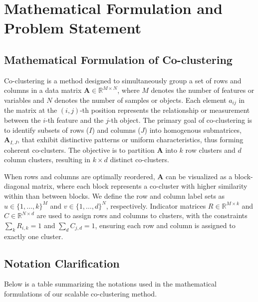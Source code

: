 
\section{Mathematical Formulation and Problem Statement}\label{sec:formula}
\subsection{Mathematical Formulation of Co-clustering}
Co-clustering is a method designed to simultaneously group a set of rows and columns in a data matrix $\mathbf{A} \in \mathbb{R}^{M \times N}$, where $M$ denotes the number of features or variables and $N$ denotes the number of samples or objects. Each element $a_{ij}$ in the matrix at the $(i, j)$-th position represents the relationship or measurement between the $i$-th feature and the $j$-th object. The primary goal of co-clustering is to identify subsets of rows ($I$) and columns ($J$) into homogenous submatrices, $\mathbf{A}_{I, J}$, that exhibit distinctive patterns or uniform characteristics, thus forming coherent co-clusters. The objective is to partition $\mathbf{A}$ into $k$ row clusters and $d$ column clusters, resulting in $k \times d$ distinct co-clusters.

When rows and columns are optimally reordered, $\mathbf{A}$ can be visualized as a block-diagonal matrix, where each block represents a co-cluster with higher similarity within than between blocks. We define the row and column label sets as \( u \in \{1,\dots,k\}^M \) and \( v \in \{1,\dots,d\}^N \), respectively. Indicator matrices \( R \in \mathbb{R}^{M \times k} \) and \( C \in \mathbb{R}^{N \times d} \) are used to assign rows and columns to clusters, with the constraints \( \sum_k R_{i,k} = 1 \) and \( \sum_d C_{j,d} = 1 \), ensuring each row and column is assigned to exactly one cluster.

\subsection{Notation Clarification}
Below is a table summarizing the notations used in the mathematical formulations of our scalable co-clustering method.

